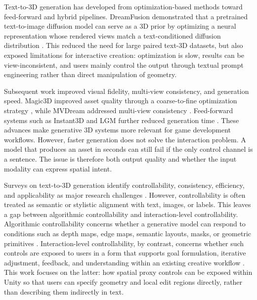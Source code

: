 \documentclass[11pt]{report}
\begin{document}
Text-to-3D generation has developed from optimization-based methods toward feed-forward and hybrid pipelines. DreamFusion demonstrated that a pretrained text-to-image diffusion model can serve as a 3D prior by optimizing a neural representation whose rendered views match a text-conditioned diffusion distribution \cite{poole2022dreamfusion}. This reduced the need for large paired text-3D datasets, but also exposed limitations for interactive creation: optimization is slow, results can be view-inconsistent, and users mainly control the output through textual prompt engineering rather than direct manipulation of geometry.

Subsequent work improved visual fidelity, multi-view consistency, and generation speed. Magic3D improved asset quality through a coarse-to-fine optimization strategy \cite{lin2023magic3d}, while MVDream addressed multi-view consistency \cite{shi2023mvdream}. Feed-forward systems such as Instant3D and LGM further reduced generation time \cite{li2023instant3d, tang2024lgm}. These advances make generative 3D systems more relevant for game development workflows. However, faster generation does not solve the interaction problem. A model that produces an asset in seconds can still fail if the only control channel is a sentence. The issue is therefore both output quality and whether the input modality can express spatial intent. 

Surveys on text-to-3D generation identify controllability, consistency, efficiency, and applicability as major research challenges \cite{li2023generative, lee2024text, jiang2024survey}. However, controllability is often treated as semantic or stylistic alignment with text, images, or labels. This leaves a gap between algorithmic controllability and interaction-level controllability. Algorithmic controllability concerns whether a generative model can respond to conditions such as depth maps, edge maps, semantic layouts, masks, or geometric primitives \cite{zhang2023controlnet,schult2024controlroom3d,fedele2025spacecontrol}. Interaction-level controllability, by contrast, concerns whether such controls are exposed to users in a form that supports goal formulation, iterative adjustment, feedback, and understanding within an existing creative workflow \cite{norman1986cognitive,shneiderman1983direct,amershi2019guidelines,shi2023hci}. This work focuses on the latter: how spatial proxy controls can be exposed within Unity so that users can specify geometry and local edit regions directly, rather than describing them indirectly in text.
\end{document}
